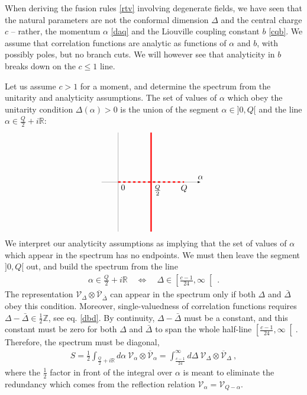 \documentclass[12pt, a4paper, notitlepage, twoside]{report}
\numberwithin{equation}{section}
\theoremstyle{break}
\begin{document}
When deriving the fusion rules \eqref{rtv} involving degenerate fields, we have seen that the natural parameters are not the conformal dimension $\Delta$ and the central charge $c$ -- rather, the momentum $\alpha$ \eqref{daq} and the Liouville coupling constant $b$ \eqref{cqb}.
We assume that correlation functions are analytic as functions of $\alpha$ and $b$, with possibly poles, but no branch cuts. 
We will however see that analyticity in $b$ breaks down on the $c\leq 1$ line.

Let us assume $c>1$ for a moment, and determine the spectrum from the unitarity and analyticity assumptions. 
The set of values of $\alpha$ which obey the unitarity condition $\Delta(\alpha)> 0$ is the union of the segment $\alpha\in]0,Q[$ and the line $\alpha \in \frac{Q}{2}+i{\mathbb{R}}$:
\begin{align}
 \begin{tikzpicture}[scale = .7, baseline=(current  bounding  box.center)]
  \draw[-latex, very thin] (-1, 0) -- (0, 0) node[below right] {$0$} -- (2, 0) node[below right] {$\frac{Q}{2}$} -- (4, 0) node [below] {$Q$} -- (5, 0) node[above] {$\alpha$};
  \draw[red, ultra thick, dashed] (0, 0) -- (4, 0);
  \draw[red, ultra thick] (2, -3) -- (2, 3);
  \draw[very thin] (0, -3) -- (0, 3);
 \end{tikzpicture}
\end{align}
We interpret our analyticity assumptions as implying that the set of values of $\alpha$ which appear in the spectrum has no endpoints. 
We must then leave the segment $]0,Q[$ out, and build the spectrum from the line
\begin{align}
 \alpha \in \frac{Q}{2}+i{\mathbb{R}} \quad \Leftrightarrow \quad \Delta \in \left[\frac{c-1}{24},\infty\right[\ .
\label{aqd}
\end{align}
The representation $\mathcal{V}_\Delta\otimes \overline{\mathcal{V}}_{\bar{\Delta}}$ can appear in the spectrum only if both 
$\Delta$ and $\bar{\Delta}$ obey this condition. 
Moreover, single-valuedness of correlation functions requires $\Delta-\bar{\Delta}\in\frac12 {\mathbb{Z}} $, see eq. \eqref{dbd}.
By continuity, $\Delta-\bar{\Delta}$ must be a constant, and this constant must be zero for both $\Delta$ and $\bar{\Delta}$ to span the whole half-line $\left[\frac{c-1}{24},\infty\right[$.
Therefore, the spectrum must be diagonal,
\begin{align}
 \boxed{ S= \frac12\int_{\frac{Q}{2}+i{\mathbb{R}}} d\alpha\ \mathcal{V}_\alpha \otimes \overline{\mathcal{V}}_\alpha = \int_{\frac{c-1}{24}}^\infty d\Delta\ \mathcal{V}_\Delta\otimes \overline{\mathcal{V}}_\Delta} \ ,
\label{sad}
\end{align}
where the $\frac12$ factor in front of the integral over $\alpha$ is meant to eliminate the redundancy which comes from the reflection relation $\mathcal{V}_\alpha=\mathcal{V}_{Q-\alpha}$. 
\end{document}
